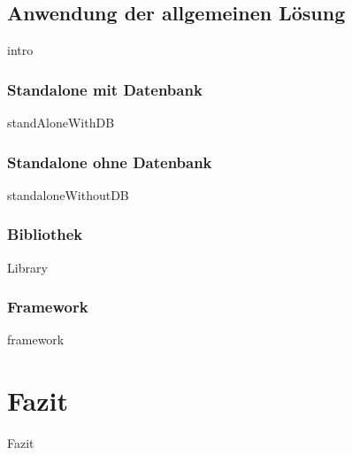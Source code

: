 \documentclass{article}
\begin{document}
    \newpage
    \subsection{Anwendung der allgemeinen Lösung}
        {intro}
        
        \newpage
        \subsubsection{Standalone mit Datenbank}
            {standAloneWithDB}

        \newpage
        \subsubsection{Standalone ohne Datenbank}
            {standaloneWithoutDB}

        \newpage
        \subsubsection{Bibliothek}
            {Library}
        
        \newpage
        \subsubsection{Framework}
            {framework}
    
\section{Fazit}
    {Fazit}




\newpage
\printbibliography[heading = bibintoc, title = Literaturverzeichnis]    %

\nocite{MF_isHighQuilatySoftwareWorthTheCost}
\nocite{enterprisePatterns}
\nocite{cleanCode}
\nocite{CiCd}
\nocite{frameworkOnline1}

\nocite{frameworkOnline2}

\nocite{frameworkOnline3}

\end{document}
